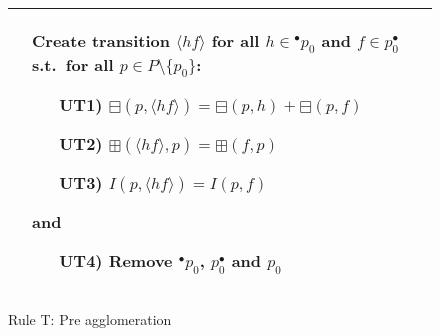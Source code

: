 \begin{figure}[h!]
\begin{adjustbox}{center}
\begin{tabular}{|p{75mm}|p{75mm}|}
        &
        Create transition $\langle hf\rangle$ for all $h\in{}^\bullet p_0$ and $f\in p_0^\bullet$ s.t.\ for all $p\in P\setminus\{p_0\}$:
        \begin{itemize}[leftmargin=12mm]
            \item[UT1)] $\boxminus(p,\langle hf\rangle)=\boxminus(p,h)+\boxminus(p,f)$
            \item[UT2)] $\boxplus(\langle hf\rangle,p)=\boxplus(f,p)$
            \item[UT3)] $I(p,\langle hf\rangle) = I(p,f)$
        \end{itemize}
        \noindent and
        \begin{itemize}[leftmargin=12mm]
            \item[UT4)] Remove ${}^\bullet p_0$, $p_0^\bullet $ and $p_0$

        \end{itemize} \\ \hline
        \end{tabular}
    \end{adjustbox}
    \caption{Rule T: Pre agglomeration}
    \label{fig:rule_t}
\end{figure}